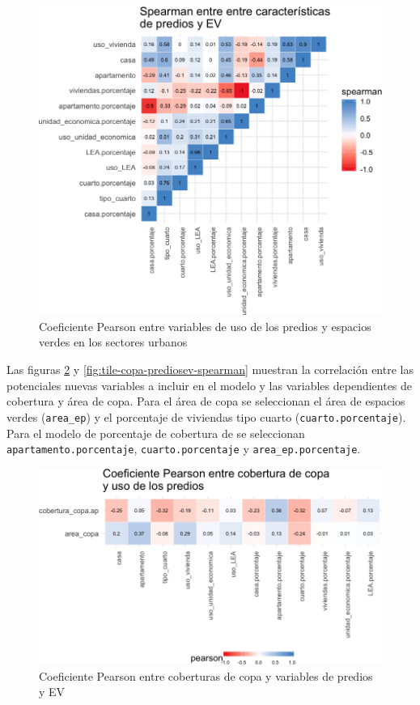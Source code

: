 \documentclass[12pt,]{book}
\begin{document}
\begin{figure}
\includegraphics[width=1\linewidth]{tesis-unigis_files/figure-latex/tile-prediosev-spearman-1} \caption{Coeficiente Pearson entre variables de uso de los predios y espacios verdes en los sectores urbanos}\label{fig:tile-prediosev-spearman}
\end{figure}

Las figuras \ref{fig:tile-copa-prediosev-pearson} y
\ref{fig:tile-copa-prediosev-spearman} muestran la correlación entre las
potenciales nuevas variables a incluir en el modelo y las variables
dependientes de cobertura y área de copa. Para el área de copa se
seleccionan el área de espacios verdes (\texttt{area\_ep}) y el
porcentaje de viviendas tipo cuarto (\texttt{cuarto.porcentaje}). Para
el modelo de porcentaje de cobertura de se seleccionan
\texttt{apartamento.porcentaje}, \texttt{cuarto.porcentaje} y
\texttt{area\_ep.porcentaje}.

\begin{figure}
\includegraphics[width=1\linewidth]{tesis-unigis_files/figure-latex/tile-copa-prediosev-pearson-1} \caption{Coeficiente Pearson entre coberturas de copa y variables de predios y EV}\label{fig:tile-copa-prediosev-pearson}
\end{figure}
\end{document}
